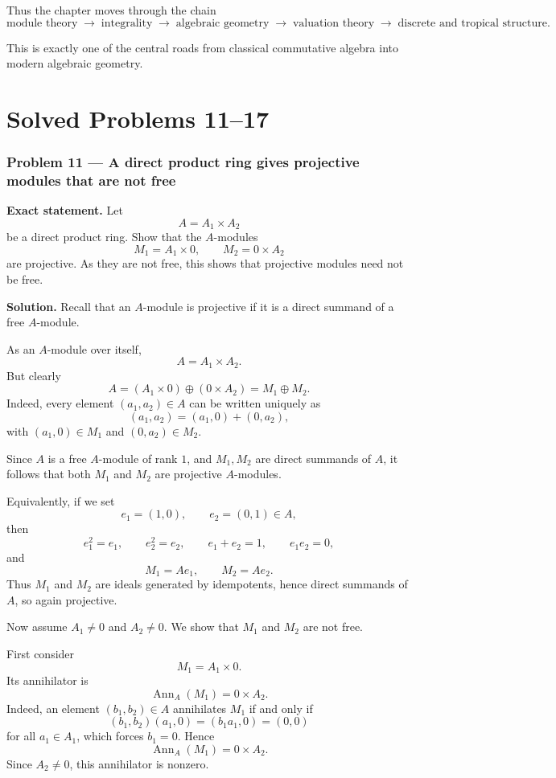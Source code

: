 \documentclass[12pt,a4paper]{article}
\theoremstyle{notespace}
\begin{document}
Thus the chapter moves through the chain
\[
\text{module theory}
\;\to\;
\text{integrality}
\;\to\;
\text{algebraic geometry}
\;\to\;
\text{valuation theory}
\;\to\;
\text{discrete and tropical structure}.
\]

This is exactly one of the central roads from classical commutative algebra into modern algebraic geometry.

\part{Solved Problems 11--17}

\section{Problem 11 --- A direct product ring gives projective modules that are not free}

\textbf{Exact statement.}
Let
\[
A=A_1\times A_2
\]
be a direct product ring. Show that the \(A\)-modules
\[
M_1=A_1\times 0,\qquad M_2=0\times A_2
\]
are projective. As they are not free, this shows that projective modules need not be free.

\textbf{Solution.}
Recall that an \(A\)-module is projective if it is a direct summand of a free \(A\)-module.

As an \(A\)-module over itself,
\[
A=A_1\times A_2.
\]
But clearly
\[
A=(A_1\times 0)\oplus (0\times A_2)=M_1\oplus M_2.
\]
Indeed, every element \((a_1,a_2)\in A\) can be written uniquely as
\[
(a_1,a_2)=(a_1,0)+(0,a_2),
\]
with \((a_1,0)\in M_1\) and \((0,a_2)\in M_2\).

Since \(A\) is a free \(A\)-module of rank \(1\), and \(M_1,M_2\) are direct summands of \(A\), it follows that both \(M_1\) and \(M_2\) are projective \(A\)-modules.

Equivalently, if we set
\[
e_1=(1,0),\qquad e_2=(0,1)\in A,
\]
then
\[
e_1^2=e_1,\qquad e_2^2=e_2,\qquad e_1+e_2=1,\qquad e_1e_2=0,
\]
and
\[
M_1=Ae_1,\qquad M_2=Ae_2.
\]
Thus \(M_1\) and \(M_2\) are ideals generated by idempotents, hence direct summands of \(A\), so again projective.

Now assume \(A_1\neq 0\) and \(A_2\neq 0\). We show that \(M_1\) and \(M_2\) are not free.

First consider
\[
M_1=A_1\times 0.
\]
Its annihilator is
\[
\operatorname{Ann}_A(M_1)=0\times A_2.
\]
Indeed, an element \((b_1,b_2)\in A\) annihilates \(M_1\) if and only if
\[
(b_1,b_2)(a_1,0)=(b_1a_1,0)=(0,0)
\]
for all \(a_1\in A_1\), which forces \(b_1=0\). Hence
\[
\operatorname{Ann}_A(M_1)=0\times A_2.
\]
Since \(A_2\neq 0\), this annihilator is nonzero.
\end{document}
